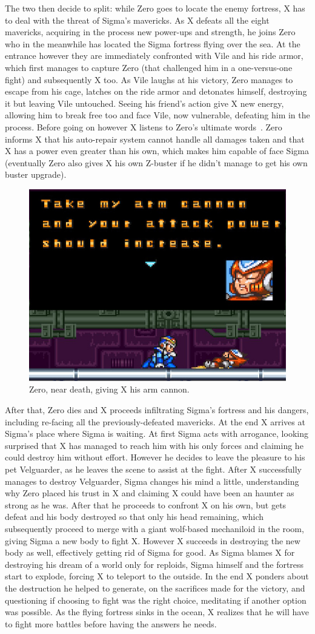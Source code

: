 The two then decide to split: while Zero goes to locate the enemy fortress, X has to deal with the threat of Sigma's mavericks. As X defeats all the eight mavericks, acquiring in the process new power-ups and strength, he joins Zero who in the meanwhile has located the Sigma fortress flying over the sea. At the entrance however they are immediately confronted with Vile and his ride armor, which first manages to capture Zero (that challenged him in a one-versus-one fight) and subsequently X too. As Vile laughs at his victory, Zero manages to escape from his cage, latches on the ride armor and detonates himself, destroying it but leaving Vile untouched. Seeing his friend's action give X new energy, allowing him to break free too and face Vile, now vulnerable, defeating him in the process. Before going on however X listens to Zero's ultimate words~\cite{wiki:MMX_script}. Zero informs X that his auto-repair system cannot handle all damages taken and that X has a power even greater than his own, which makes him capable of face Sigma (eventually Zero also gives X his own Z-buster if he didn't manage to get his own buster upgrade).
\begin{figure}[htp]
	\centering
	\includegraphics[width=0.5\linewidth]{figures/X1/Zero_cannon.jpg}
	\caption{Zero, near death, giving X his arm cannon.}
\end{figure}
After that, Zero dies and X proceeds infiltrating Sigma's fortress and his dangers, including re-facing all the previously-defeated mavericks. At the end X arrives at Sigma's place where Sigma is waiting. At first Sigma acts with arrogance, looking surprised that X has managed to reach him with his only forces and claiming he could destroy him without effort. However he decides to leave the pleasure to his pet Velguarder, as he leaves the scene to assist at the fight. After X successfully manages to destroy Velguarder, Sigma changes his mind a little, understanding why Zero placed his trust in X and claiming X could have been an haunter as strong as he was. After that he proceeds to confront X on his own, but gets defeat and his body destroyed so that only his head remaining, which subsequently proceed to merge with a giant wolf-based mechaniloid in the room, giving Sigma a new body to fight X. However X succeeds in destroying the new body as well, effectively getting rid of Sigma for good. As Sigma blames X for destroying his dream of a world only for reploids, Sigma himself and the fortress start to explode, forcing X to teleport to the outside. In the end X ponders about the destruction he helped to generate, on the sacrifices made for the victory, and questioning if choosing to fight was the right choice, meditating if another option was possible. As the flying fortress sinks in the ocean, X realizes that he will have to fight more battles before having the answers he needs. 
